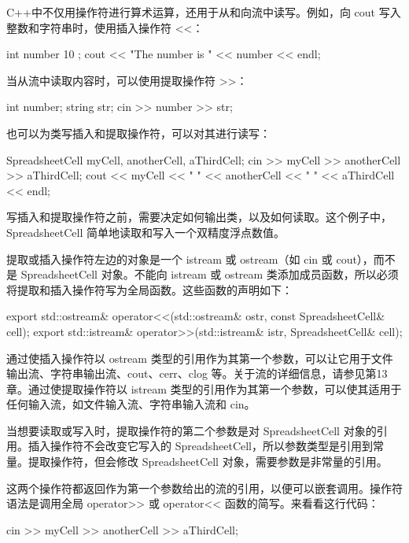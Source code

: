 C++中不仅用操作符进行算术运算，还用于从和向流中读写。例如，向 cout 写入整数和字符串时，使用插入操作符 <{}<：

\begin{cpp}
int number { 10 };
cout << "The number is " << number << endl;
\end{cpp}

当从流中读取内容时，可以使用提取操作符 >{}>：

\begin{cpp}
int number;
string str;
cin >> number >> str;
\end{cpp}

也可以为类写插入和提取操作符，可以对其进行读写：

\begin{cpp}
SpreadsheetCell myCell, anotherCell, aThirdCell;
cin >> myCell >> anotherCell >> aThirdCell;
cout << myCell << " " << anotherCell << " " << aThirdCell << endl;
\end{cpp}

写插入和提取操作符之前，需要决定如何输出类，以及如何读取。这个例子中，SpreadsheetCell 简单地读取和写入一个双精度浮点数值。

提取或插入操作符左边的对象是一个 istream 或 ostream（如 cin 或 cout），而不是 SpreadsheetCell 对象。不能向 istream 或 ostream 类添加成员函数，所以必须将提取和插入操作符写为全局函数。这些函数的声明如下：

\begin{cpp}
export std::ostream& operator<<(std::ostream& ostr, const SpreadsheetCell& cell);
export std::istream& operator>>(std::istream& istr, SpreadsheetCell& cell);
\end{cpp}

通过使插入操作符以 ostream 类型的引用作为其第一个参数，可以让它用于文件输出流、字符串输出流、cout、cerr、clog 等。关于流的详细信息，请参见第13章。通过使提取操作符以 istream 类型的引用作为其第一个参数，可以使其适用于任何输入流，如文件输入流、字符串输入流和 cin。

当想要读取或写入时，提取操作符的第二个参数是对 SpreadsheetCell 对象的引用。插入操作符不会改变它写入的 SpreadsheetCell，所以参数类型是引用到常量。提取操作符，但会修改 SpreadsheetCell 对象，需要参数是非常量的引用。

这两个操作符都返回作为第一个参数给出的流的引用，以便可以嵌套调用。操作符语法是调用全局 operator>{}> 或 operator<{}< 函数的简写。来看看这行代码：

\begin{cpp}
cin >> myCell >> anotherCell >> aThirdCell;
\end{cpp}

